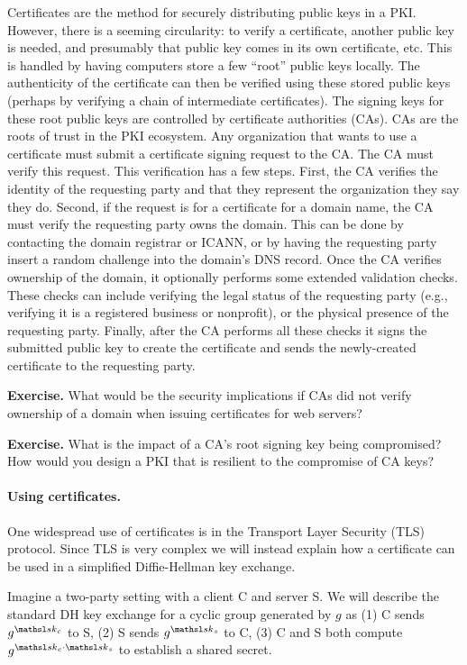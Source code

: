 Certificates are the method for securely distributing public keys in a PKI. However,
there is a seeming circularity: to verify a certificate, another public key is needed,
and presumably that public key comes in its own certificate, etc. This is handled
by having computers store a few ``root'' public keys locally. The authenticity
of the certificate can then be verified using these stored public keys
(perhaps by verifying a chain of intermediate certificates). The
signing keys for these root public keys are controlled by certificate
authorities (CAs). CAs are the roots of trust in the PKI
ecosystem. Any organization that wants to use a certificate must
submit a certificate signing request to the CA.  The CA must verify
this request. This verification has a few steps. First, the CA verifies
the identity of the requesting party and that they represent the organization
they say they do. Second, if the request is for a certificate for a domain
name, the CA must verify the requesting party owns the domain. This can be
done by contacting the domain registrar or ICANN, or by having the requesting
party insert a random challenge into the domain's DNS record. Once the CA verifies
ownership of the domain, it optionally performs some extended validation checks.
These checks can include verifying the legal status of the requesting party
(e.g., verifying it is a registered business or nonprofit), or the physical
presence of the requesting party. Finally, after the CA performs all these checks
it signs the submitted public key to create the certificate and sends the newly-created
certificate to the requesting party.

\noindent\textbf{Exercise.} What would be the security implications if
CAs did not verify ownership of a domain when issuing certificates for web servers?

\noindent\textbf{Exercise.} What is the impact of a CA's root signing key being
compromised? How would you design a PKI that is resilient to the compromise
of CA keys?

\paragraph{Using certificates.} One widespread use of certificates is
in the Transport Layer Security (TLS) protocol. Since TLS is very complex
we will instead explain how a certificate can be used in a simplified Diffie-Hellman
key exchange.

Imagine a two-party setting with a client C and server S.
We will describe the standard DH key exchange for a cyclic
group generated by $g$ as (1) C sends $g^{\sk_c}$ to S,
(2) S sends $g^{\sk_s}$ to C, (3) C and S both compute
$g^{\sk_c \cdot \sk_s}$ to establish a shared secret.

